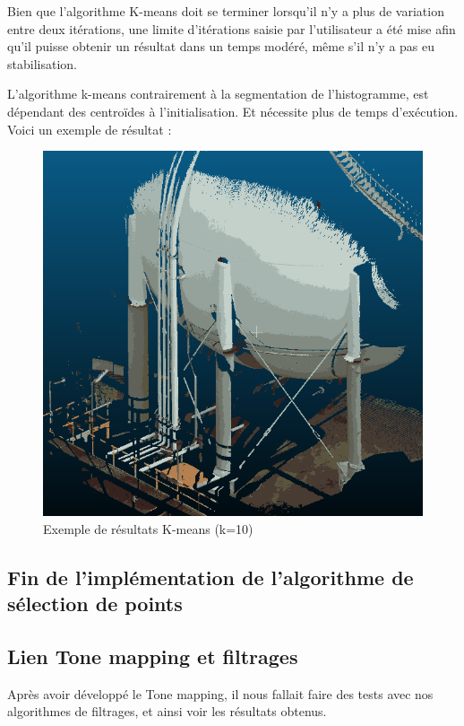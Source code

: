 \documentclass[12pt,titlepage,french]{article}
\begin{document}
Bien que l'algorithme K-means doit se terminer lorsqu'il n'y a plus de variation entre deux itérations,
une limite d'itérations saisie par l'utilisateur a été mise afin qu'il puisse obtenir un résultat dans un temps modéré, même s'il n'y a pas eu stabilisation.

L'algorithme k-means contrairement à la segmentation de l'histogramme, est dépendant des centroïdes à l'initialisation. Et nécessite plus de temps d'exécution.
Voici un exemple de résultat :

\begin{figure}[H]
 \caption{\label{} Exemple de résultats K-means (k=10)}
 \begin{center}
 \includegraphics[width=1\textwidth]{./img/kmeans_It.PNG}
  \end{center}
\end{figure}

\subsection{Fin de l'implémentation de l'algorithme de sélection de points}

\subsection{Lien Tone mapping et filtrages}
Après avoir développé le Tone mapping, il nous fallait faire des tests avec nos algorithmes de filtrages, et ainsi voir les résultats obtenus.
\end{document}
